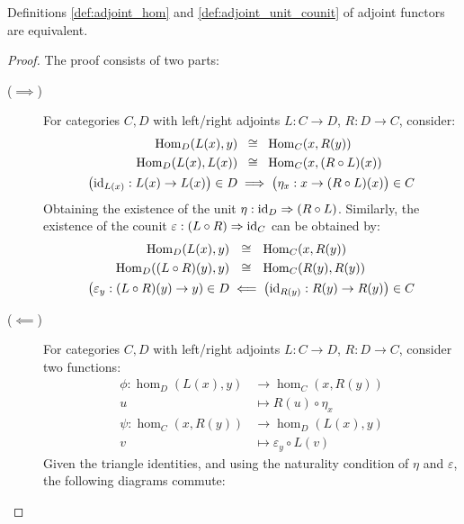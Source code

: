 \begin{theorem}
  Definitions \ref{def:adjoint_hom} and \ref{def:adjoint_unit_counit} of adjoint
  functors are equivalent.

  \begin{proof}
    The proof consists of two parts:
    \begin{description}
      \item[($\implies$)] For categories $C,D$ with left/right adjoints $L:C\to
        D$, $R:D\to C$, consider:
        \[
          \begin{aligned}
            \mathrm{Hom}_D(L(x), y) &\ \:\cong\ \: \mathrm{Hom}_C(x, R(y))\\
            \mathrm{Hom}_D(L(x), L(x)) &\ \:\cong\ \: \mathrm{Hom}_C(x, (R\circ L)(x))\\
            \big(\mathrm{id}_{L(x)}: L(x) \to L(x)\big) \in D
            &\implies \big(\eta_x : x \to (R\circ L)(x)\big)\in C
          \end{aligned}
        \]
        Obtaining the existence of the unit $\eta:\mathrm{id}_D\Rightarrow (R\circ L)$.
        Similarly, the existence of the counit $\varepsilon:(L\circ
        R)\Rightarrow\mathrm{id}_C$ can be obtained by:
        \[
          \begin{aligned}
            \mathrm{Hom}_D(L(x), y) &\ \ \cong\ \ \mathrm{Hom}_C(x, R(y))\\
            \mathrm{Hom}_D((L\circ R)(y), y) &\ \ \cong\ \ \mathrm{Hom}_C(R(y), R(y))\\
            \big(\varepsilon_{y} : (L\circ R)(y) \to y) \in D
            &\impliedby \big(\mathrm{id}_{R(y)}: R(y) \to R(y)\big) \in C
          \end{aligned}
        \]
      \item[($\impliedby$)] For categories $C,D$ with left/right adjoints
        $L:C\to D$, $R:D\to C$, consider two functions:
        \[
          \begin{aligned}
            \phi: \hom_D(L(x), y) &\to \hom_C(x, R(y))\\
            u &\mapsto R(u)\circ \eta_x\\
            \psi: \hom_C(x, R(y)) &\to \hom_D(L(x), y)\\
            v &\mapsto \varepsilon_y \circ L(v)
          \end{aligned}
        \]
        Given the triangle identities, and using the naturality condition of $\eta$ and $\varepsilon$, the following diagrams commute:

\end{description}
\end{proof}
\end{theorem}
